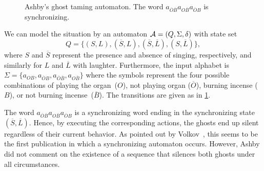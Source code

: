 \begin{figure}[htb]
\centering
{}
\caption[Ashby's ghost taming automaton]{Ashby's ghost taming automaton. 
	The word $a_{\overline O \overline B} a_{O \overline B} a_{\overline O  B}$	is synchronizing.}
\label{intro:fig:ashby}
\end{figure} 

We can model the situation 
by an automaton $\mathcal A = (Q, \Sigma, \delta)$ with
state set 
\[
Q = \{ (S, L), (\overline S, L), (\overline S, \overline L), (S, \overline L) \},
\]
where $S$ and $\overline S$ represent the presence and absence of singing, respectively, 
and similarly for $L$ and $\overline L$ with laughter.
Furthermore, the input alphabet is 
$ \Sigma = \{ a_{OB}, a_{\overline O B}, a_{\overline O \overline B}, a_{O \overline B}\}
$
where the symbols represent the four possible combinations of playing the organ~($O$), 
not playing organ ($\overline O$),
burning incense ($B$), or not burning incense~($\overline B$).
The transitions are given as in \cref{intro:fig:ashby}.

The word $a_{\overline O \overline B} a_{O \overline B} a_{\overline O  B}$
is a synchronizing word ending in the synchronizing state $(\overline S, \overline L)$.
Hence, by executing the corresponding actions, the ghosts end up silent regardless of their current behavior.
As pointed out by Volkov~\cite{DBLP:conf/lata/Volkov08}, this seems to be the first publication in which a synchronizing automaton occurs. However, Ashby did not comment on the existence of a sequence that silences both ghosts under all circumstances.

